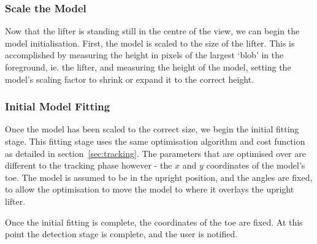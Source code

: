 \subsubsection{Scale the Model}
Now that the lifter is standing still in the centre of the view, we can begin the model initialisation. First, the model is scaled to the size of the lifter. This is accomplished by measuring the height in pixels of the largest `blob' in the foreground, ie. the lifter, and measuring the height of the model, setting the model's scaling factor to shrink or expand it to the correct height.

\subsubsection{Initial Model Fitting}
Once the model has been scaled to the correct size, we begin the initial fitting stage. This fitting stage uses the same optimisation algorithm and cost function as detailed in section~\ref{sec:tracking}. The parameters that are optimised over are different to the tracking phase however - the $x$ and $y$ coordinates of the model's toe. The model is assumed to be in the upright position, and the angles are fixed, to allow the optimisation to move the model to where it overlays the upright lifter.

Once the initial fitting is complete, the coordinates of the toe are fixed. At this point the detection stage is complete, and the user is notified.